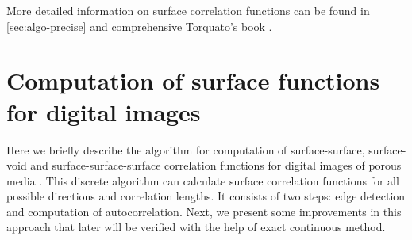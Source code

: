 \documentclass[preprint]{elsarticle}
\begin{document}
More detailed information on surface correlation functions can be found in
\cref{sec:algo-precise} and comprehensive Torquato's book \cite{Torquato_book}.

\section{Computation of surface functions for digital images}
\label{sec:algo}
Here we briefly describe the algorithm for computation of surface-surface,
surface-void and surface-surface-surface correlation functions for digital
images of porous media \cite{Samarin}. This discrete algorithm can calculate
surface correlation functions for all possible directions and correlation
lengths. It consists of two steps: edge detection and computation of
autocorrelation. Next, we present some improvements in this approach that later
will be verified with the help of exact continuous method.
\end{document}
